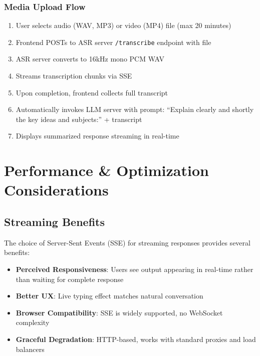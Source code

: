 \documentclass[12pt,a4paper]{report}
\begin{document}
\subsubsection{Media Upload Flow}

\begin{enumerate}
    \item User selects audio (WAV, MP3) or video (MP4) file (max 20 minutes)
    \item Frontend POSTs to ASR server \texttt{/transcribe} endpoint with file
    \item ASR server converts to 16kHz mono PCM WAV
    \item Streams transcription chunks via SSE
    \item Upon completion, frontend collects full transcript
    \item Automatically invokes LLM server with prompt: ``Explain clearly and shortly the key ideas and subjects:'' + transcript
    \item Displays summarized response streaming in real-time
\end{enumerate}

\section{Performance \& Optimization Considerations}

\subsection{Streaming Benefits}

The choice of Server-Sent Events (SSE) for streaming responses provides several benefits:

\begin{itemize}
    \item \textbf{Perceived Responsiveness}: Users see output appearing in real-time rather than waiting for complete response
    \item \textbf{Better UX}: Live typing effect matches natural conversation
    \item \textbf{Browser Compatibility}: SSE is widely supported, no WebSocket complexity
    \item \textbf{Graceful Degradation}: HTTP-based, works with standard proxies and load balancers
\end{itemize}
\end{document}
